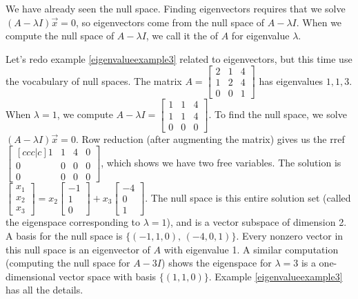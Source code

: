We have already seen the null space. Finding eigenvectors requires that we solve $(A-\lambda I)\vec x = 0$, so eigenvectors come from the null space of $A-\lambda I$.  When we compute the null space of $A-\lambda I$, we call it the  of $A$ for eigenvalue $\lambda$.

\begin{example}
Let's redo example \ref{eigenvalueexample3} related to eigenvectors, but this time use the vocabulary of null spaces.  
The matrix 
$A=\begin{bmatrix}2&1&4\\ 1&2&4\\ 0&0&1\end{bmatrix}$ has eigenvalues $1,1,3$. 
When $\lambda=1$, we compute $A-\lambda I =\begin{bmatrix}1&1&4\\ 1&1&4\\ 0&0&0\end{bmatrix} $. To find the null space, we solve $(A-\lambda I )\vec x=0$. Row reduction (after augmenting the matrix) gives us the rref $\begin{bmatrix}[ccc|c]1&1&4&0\\ 0&0&0&0\\ 0&0&0&0\end{bmatrix}$, which shows we have two free variables. The solution is $\begin{bmatrix} x_1\\x_2\\ x_3\end{bmatrix} = x_2\begin{bmatrix} -1\\1\\0\end{bmatrix}+x_3\begin{bmatrix} -4\\0\\1\end{bmatrix} $. The null space is this entire solution set (called the eigenspace corresponding to $\lambda = 1$), and is a vector subspace of dimension 2. A basis for the null space is $\{(-1,1,0),\,(-4,0,1)\}$.
Every nonzero vector in this null space is an eigenvector of $A$ with eigenvalue 1.  A similar computation (computing the null space for $A-3I$) shows the eigenspace for $\lambda = 3$ is a one-dimensional vector space with basis $\{(1,1,0)\}$. Example \ref{eigenvalueexample3} has all the details.
\end{example}



